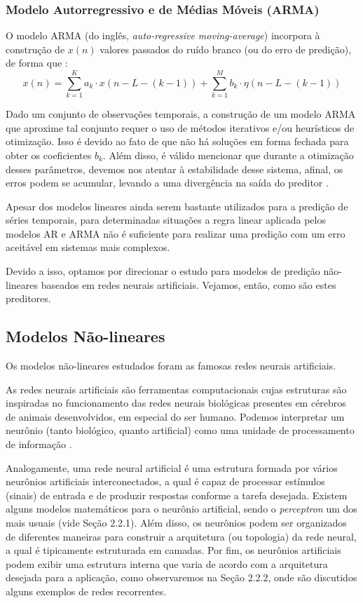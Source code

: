 \documentclass[a4paper, 12pt]{article}
\begin{document}
\subsubsection{Modelo Autorregressivo e de Médias Móveis (ARMA)}

O modelo ARMA (do inglês, \textit{auto-regressive moving-average}) incorpora à construção de $x(n)$ valores passados do ruído branco (ou do erro de predição), de forma que \cite{box2015time}:
\begin{equation}
x(n) = \sum_{k = 1}^{K} a_{k} \cdot x(n - L - (k-1)) + \sum_{k=1}^{M} b_{k} \cdot \eta(n - L - (k-1))
\end{equation} 

Dado um conjunto de observações temporais, a construção de um modelo ARMA que aproxime tal conjunto requer o uso de métodos iterativos e/ou heurísticos de otimização. Isso é devido ao fato de que não há soluções em forma fechada para obter os coeficientes $b_k$. Além disso, é válido mencionar que durante a otimização desses parâmetros, devemos nos atentar à estabilidade desse sistema, afinal, os erros podem se acumular, levando a uma divergência na saída do preditor \cite{box2015time}.

Apesar dos modelos lineares ainda serem bastante utilizados para a predição de séries temporais, para determinadas situações a regra linear aplicada pelos modelos AR e ARMA não é suficiente para realizar uma predição com um erro aceitável em sistemas mais complexos. 

Devido a isso, optamos por direcionar o estudo para modelos de predição não-lineares baseados em redes neurais artificiais. Vejamos, então, como são estes preditores. 

\subsection{Modelos Não-lineares}

Os modelos não-lineares estudados foram as famosas redes neurais artificiais.

As redes neurais artificiais são ferramentas computacionais cujas estruturas são inspiradas no funcionamento das redes neurais biológicas presentes em cérebros de animais desenvolvidos, em especial do ser humano. Podemos interpretar um neurônio (tanto biológico, quanto artificial) como uma unidade de processamento de informação \cite{haykin2010neural}. 

Analogamente, uma rede neural artificial é uma estrutura formada por vários neurô\-nios artificiais interconectados, a qual é capaz de processar estímulos (sinais) de entrada e de produzir respostas conforme a tarefa desejada. Existem alguns modelos matemáticos para o neurônio artificial, sendo o \textit{perceptron} um dos mais usuais (vide Seção 2.2.1). Além disso, os neurônios podem ser organizados de diferentes maneiras para construir a arquitetura (ou topologia) da rede neural, a qual é tipicamente estruturada em camadas. Por fim, os neurônios artificiais podem exibir uma estrutura interna que varia de acordo com a arquitetura desejada para a aplicação, como observaremos na Seção 2.2.2, onde são discutidos alguns exemplos de redes recorrentes.
\end{document}
